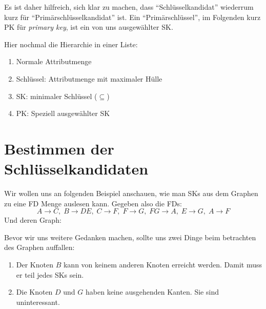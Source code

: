 \documentclass[a4paper, ngerman]{article}
\begin{document}
Es ist daher hilfreich, sich klar zu machen,
dass \enquote{Schlüsselkandidat} wiederrum kurz
für \enquote{Primärschlüsselkandidat} ist.
Ein \enquote{Primärschlüssel},
im Folgenden kurz PK für \emph{primary key},
ist ein von uns ausgewählter SK.

Hier nochmal die Hierarchie in einer Liste:
\begin{enumerate}
    \item Normale Attributmenge
    \item Schlüssel: Attributmenge mit maximaler Hülle
    \item SK: minimaler Schlüssel ($\subseteq$)
    \item PK: Speziell ausgewählter SK
\end{enumerate}

\section*{Bestimmen der Schlüsselkandidaten}
Wir wollen uns an folgenden Beispiel anschauen,
wie man SKs aus dem Graphen zu eine FD Menge auslesen kann.
Gegeben also die FDs:
$$
    A  \to C,\;
    B  \to DE,\;
    C  \to F,\;
    F  \to G,\;
    FG \to A,\;
    E  \to G,\;
    A  \to F
$$
Und deren Graph:
\begin{center}
\end{center}
Bevor wir uns weitere Gedanken machen,
sollte uns zwei Dinge beim betrachten des Graphen auffallen:
\begin{enumerate}
    \item Der Knoten $B$ kann von keinem anderen Knoten erreicht werden.
        Damit muss er teil jedes SKs sein.
    \item Die Knoten $D$ und $G$ haben keine ausgehenden Kanten.
        Sie sind uninteressant.
\end{enumerate}
\end{document}
